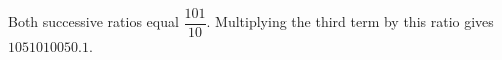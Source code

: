Both successive ratios equal $\dfrac{101}{10}$. Multiplying the third term by this ratio gives $\boxed{1051010050.1}$.
